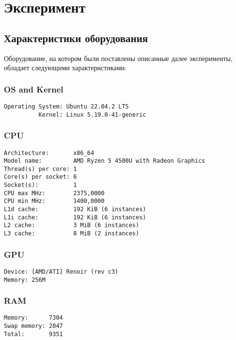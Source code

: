 
\section{Эксперимент}

\subsection{Характеристики оборудования}
Оборудование, на котором были поставлены описанные далее эксперименты, обладает следующими характеристиками:
\subsubsection*{OS and Kernel}
\begin{verbatim}
Operating System: Ubuntu 22.04.2 LTS
          Kernel: Linux 5.19.0-41-generic
\end{verbatim}

\subsubsection*{CPU}
\begin{verbatim}
Architecture:       x86_64
Model name:         AMD Ryzen 5 4500U with Radeon Graphics
Thread(s) per core: 1
Core(s) per socket: 6
Socket(s):          1
CPU max MHz:        2375,0000
CPU min MHz:        1400,0000
L1d cache:          192 KiB (6 instances)
L1i cache:          192 KiB (6 instances)
L2 cache:           3 MiB (6 instances)
L3 cache:           8 MiB (2 instances)
\end{verbatim}

\subsubsection*{GPU}
\begin{verbatim}
Device: [AMD/ATI] Renoir (rev c3)
Memory: 256M
\end{verbatim}

\subsubsection*{RAM}
\begin{verbatim}
Memory:      7304
Swap memory: 2047
Total:       9351 
\end{verbatim}

